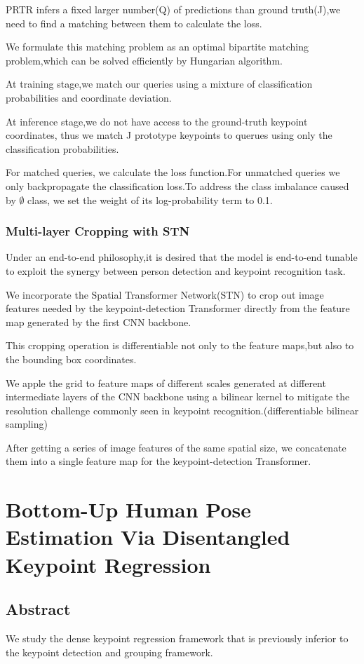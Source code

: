 \documentclass[11pt]{article}
\begin{document}
PRTR infers a fixed larger number(Q) of predictions than ground truth(J),we need to find a matching between them to calculate the loss.

We formulate this matching problem as an optimal bipartite matching problem,which can be solved efficiently by Hungarian algorithm.

At training stage,we match our queries using a mixture of classification probabilities and coordinate deviation.

At inference stage,we do not have access to the ground-truth keypoint coordinates, thus we match J prototype keypoints to querues using only the classification probabilities.

For matched queries, we calculate the loss function.For unmatched queries we only backpropagate the classification loss.To address the class imbalance caused by $\emptyset$ class, we set the weight of its log-probability term to 0.1.

\subsubsection{Multi-layer Cropping with STN}

Under an end-to-end philosophy,it is desired that the model is end-to-end tunable to exploit the synergy between person detection and keypoint recognition task.

We incorporate the Spatial Transformer Network(STN) to crop out image features needed by the keypoint-detection Transformer directly from the feature map generated by the first CNN backbone.

This cropping operation is differentiable not only to the feature maps,but also to the bounding box coordinates.

We apple the grid to feature maps of different scales generated at different intermediate layers of the CNN backbone using a bilinear kernel to mitigate the resolution challenge commonly seen in keypoint recognition.(differentiable bilinear sampling)

After getting a series of image features of the same spatial size, we concatenate them into a single feature map for the keypoint-detection Transformer.
\section{Bottom-Up Human Pose Estimation Via Disentangled Keypoint Regression}
\subsection{Abstract}
We study the dense keypoint regression framework that is previously inferior to the keypoint detection and grouping framework. 
\end{document}
